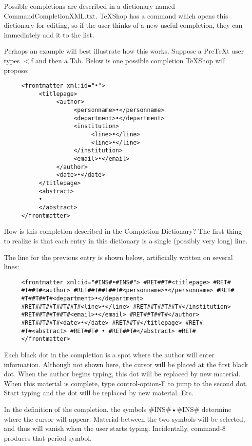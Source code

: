 \documentclass[11pt, oneside]{article}   	%
\begin{document}
Possible completions are described in a dictionary named CommandCompletionXML.txt. TeXShop has a command which opens this dictionary for editing, so if the user thinks of a new useful completion, they can immediately add it to the list.

Perhaps an example will best illustrate how this works. Suppose a PreTeXt user types $<$f and then a Tab.
Below is  one possible completion TeXShop will propose:

\begin{verbatim}
     <frontmatter xml:id="•"> 
          <titlepage> 
               <author> 
                    <personname>•</personname> 
                    <department>•</department> 
                    <institution> 
                         <line>•</line> 
                         <line>•</line> 
                    </institution> 
                    <email>•</email> 
               </author> 
               <date>•</date> 
          </titlepage> 
          <abstract> 
          • 
          </abstract> 
     </frontmatter>
\end{verbatim}

How is this completion described in the Completion Dictionary? The first thing to realize is that each entry in this dictionary is a single (possibly very long) line.

The line for the previous entry is shown below, artificially written on several lines:
\begin{verbatim}
     <frontmatter xml:id="#INS#•#INS#"> #RET##T#<titlepage> #RET#
     #T##T#<author> #RET##T##T##T#<personname>•</personname> #RET#
     #T##T##T#<department>•</department>
     #RET##T##T##T##T#<line>•</line> #RET##T##T##T#</institution> 
     #RET##T##T##T#<email>•</email> #RET##T##T#</author> 
     #RET##T##T#<date>•</date> #RET##T#</titlepage> #RET#
     #T#<abstract> #RET##T# • #RET##T#</abstract> #RET#
     </frontmatter>
\end{verbatim}

Each black dot in the completion is a spot where the author will enter information. Although not shown here, the cursor will be placed at the first black dot. When the author begins typing, this dot will be replaced by new material. When this material is complete,  type control-option-F to jump to the second dot. Start typing and the dot will be replaced by  new material. Etc.

In the definition of the completion, the symbols \#INS\#•\#INS\# determine where the cursor will appear. Material between the two symbols will be selected, and thus will vanish when the user starts typing. Incidentally, command-8 produces that period symbol.
\end{document}
